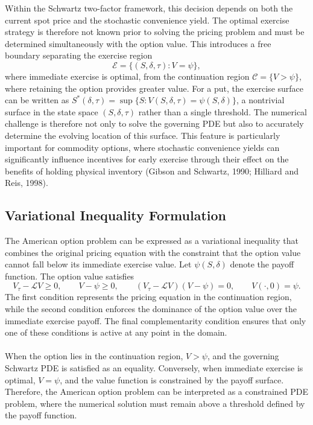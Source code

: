\documentclass[12pt,a4paper]{article}
\begin{document}
Within the Schwartz two-factor framework, this decision depends on both the current spot price and the stochastic convenience yield. The optimal exercise strategy is therefore not known prior to solving the pricing problem and must be determined simultaneously with the option value. This introduces a free boundary separating the exercise region
\begin{equation}
\mathcal{E}=\{(S,\delta,\tau):V=\psi\},
\end{equation}
where immediate exercise is optimal, from the continuation region $\mathcal{C}=\{V>\psi\}$, where retaining the option provides greater value. For a put, the exercise surface can be written as $S^*(\delta,\tau)=\sup\{S:V(S,\delta,\tau)=\psi(S,\delta)\}$, a nontrivial surface in the state space $(S,\delta,\tau)$ rather than a single threshold. The numerical challenge is therefore not only to solve the governing PDE but also to accurately determine the evolving location of this surface. This feature is particularly important for commodity options, where stochastic convenience yields can significantly influence incentives for early exercise through their effect on the benefits of holding physical inventory (Gibson and Schwartz, 1990; Hilliard and Reis, 1998).

\subsection{Variational Inequality Formulation}

The American option problem can be expressed as a variational inequality that combines the original pricing equation with the constraint that the option value cannot fall below its immediate exercise value. Let $\psi(S,\delta)$ denote the payoff function. The option value satisfies
\begin{equation}\label{eq:lcp}
V_\tau-\mathcal{L}V\geq 0,\qquad
V-\psi\geq 0,\qquad
\left(V_\tau-\mathcal{L}V\right)(V-\psi)=0,\qquad V(\cdot,0)=\psi.
\end{equation}
The first condition represents the pricing equation in the continuation region, while the second condition enforces the dominance of the option value over the immediate exercise payoff. The final complementarity condition ensures that only one of these conditions is active at any point in the domain.\\\\
When the option lies in the continuation region, $V>\psi$, and the governing Schwartz PDE is satisfied as an equality. Conversely, when immediate exercise is optimal, $V=\psi$, and the value function is constrained by the payoff surface. Therefore, the American option problem can be interpreted as a constrained PDE problem, where the numerical solution must remain above a threshold defined by the payoff function.
\end{document}
